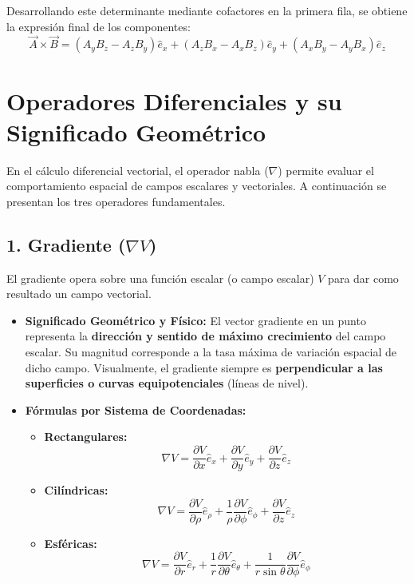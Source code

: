 \documentclass[11pt, a4paper]{article}
\begin{document}
Desarrollando este determinante mediante cofactores en la primera fila, se obtiene la expresión final de los componentes:
$$\boxed{\vec{A} \times \vec{B} = (A_yB_z - A_zB_y)\hat{e}_x + (A_zB_x - A_xB_z)\hat{e}_y + (A_xB_y - A_yB_x)\hat{e}_z}$$

\vspace{0.5cm}

\section{Operadores Diferenciales y su Significado Geométrico}

En el cálculo diferencial vectorial, el operador nabla ($\nabla$) permite evaluar el comportamiento espacial de campos escalares y vectoriales. A continuación se presentan los tres operadores fundamentales.

\subsection{1. Gradiente ($\nabla V$)}

El gradiente opera sobre una función escalar (o campo escalar) $V$ para dar como resultado un campo vectorial.

\begin{itemize}
    \item \textbf{Significado Geométrico y Físico:}
    El vector gradiente en un punto representa la \textbf{dirección y sentido de máximo crecimiento} del campo escalar. Su magnitud corresponde a la tasa máxima de variación espacial de dicho campo. Visualmente, el gradiente siempre es \textbf{perpendicular a las superficies o curvas equipotenciales} (líneas de nivel).
    
    \item \textbf{Fórmulas por Sistema de Coordenadas:}
    \begin{itemize}
        \item \textbf{Rectangulares:}
        $$\nabla V = \frac{\partial V}{\partial x}\hat{e}_x + \frac{\partial V}{\partial y}\hat{e}_y + \frac{\partial V}{\partial z}\hat{e}_z$$
        
        \item \textbf{Cilíndricas:}
        $$\nabla V = \frac{\partial V}{\partial \rho}\hat{e}_\rho + \frac{1}{\rho}\frac{\partial V}{\partial \phi}\hat{e}_\phi + \frac{\partial V}{\partial z}\hat{e}_z$$
        
        \item \textbf{Esféricas:}
        $$\nabla V = \frac{\partial V}{\partial r}\hat{e}_r + \frac{1}{r}\frac{\partial V}{\partial \theta}\hat{e}_\theta + \frac{1}{r\sin\theta}\frac{\partial V}{\partial \phi}\hat{e}_\phi$$
    \end{itemize}
\end{itemize}
\end{document}

